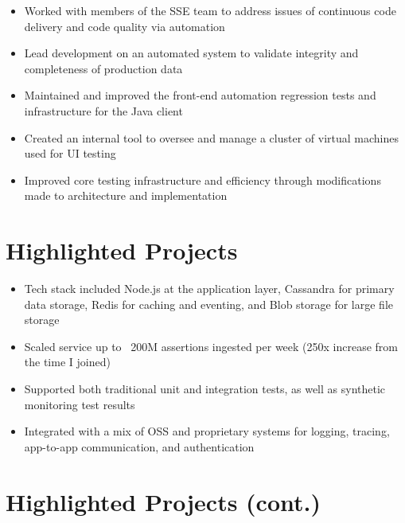 \documentclass[11pt,letterpaper,sans]{moderncv}        %
\begin{document}
\begin{itemize}
\item Worked with members of the SSE team to address issues of continuous code delivery and code quality via automation
\item Lead development on an automated system to validate integrity and completeness of production data
\item Maintained and improved the front-end automation regression tests and infrastructure for the Java client
\end{itemize}

\begin{itemize}
\item Created an internal tool to oversee and manage a cluster of virtual machines used for UI testing
\item Improved core testing infrastructure and efficiency through modifications made to architecture and implementation
\end{itemize}

\section{Highlighted Projects}

\begin{itemize}
\item Tech stack included Node.js at the application layer, Cassandra for primary data storage, Redis for caching and eventing, and Blob storage for large file storage
\item Scaled service up to ~200M assertions ingested per week (250x increase from the time I joined)
\item Supported both traditional unit and integration tests, as well as synthetic monitoring test results
\item Integrated with a mix of OSS and proprietary systems for logging, tracing, app-to-app communication, and authentication
\end{itemize}

\section{Highlighted Projects (cont.)}
\end{document}
